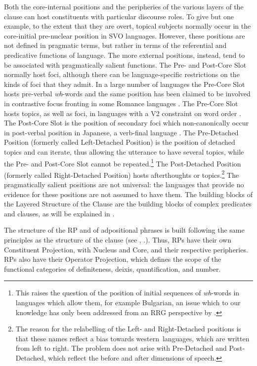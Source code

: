 \documentclass[output=paper,hidelinks]{langscibook}
\begin{document}
  Both the core-internal positions and the peripheries of the various layers of the clause can host constituents with particular discourse roles. To give but one example, to the extent that they are overt, topical subjects normally occur in the core-initial pre-nuclear position in SVO languages. However, these positions are not defined in pragmatic terms, but rather in terms of the referential and predicative functions of language. The more external positions, instead, tend to be associated with pragmatically salient functions. The Pre- and Post-Core Slot normally host foci, although there can be language-specific restrictions on the kinds of foci that they admit. In a large number of languages the Pre-Core Slot hosts pre-verbal \textit{wh}{}-words and the same position has been claimed to be involved in contrastive focus fronting in some Romance languages \citep{Bentley2008}. The Pre-Core Slot hosts topics, as well as foci, in languages with a V2 constraint on word order \citep{Diedrichsen2008}. The Post-Core Slot is the position of secondary foci which non-canonically occur in post-verbal position in Japanese, a verb-final language \citep{Shimojo1995}. The Pre-Detached Position (formerly called Left-Detached Position) is the position of detached topics and can iterate, thus allowing the utterance to have several topics, while the Pre- and Post-Core Slot cannot be repeated.\footnote{This raises the question of the position of initial sequences of \textit{wh}{}-words in languages which allow them, for example Bulgarian, an issue which to our knowledge has only been addressed from an RRG perspective by \citet{Eschenberg1999}.} The Post-Detached Position (formerly called Right-Detached Position) hosts afterthoughts or topics.\footnote{The reason for the relabelling of the Left{}- and Right{}-Detached positions is that these names reflect a bias towards western~languages, which are written from left to right. The problem does not arise with Pre-Detached and Post-Detached, which reflect the before and after dimensions of speech.} The pragmatically salient positions are not universal: the languages that provide no evidence for these positions are not assumed to have them. The building blocks of the Layered Structure of the Clause are the building blocks of complex predicates and clauses, as will be explained in .

  The structure of the RP and of adpositional phrases is built following the same principles as the structure of the clause (see \citealt{CortezRodriguez2022}, \citealt{Cerda2022}.). Thus, RPs have their own Constituent Projection, with Nucleus and Core, and their respective peripheries. RPs also have their Operator Projection, which defines the scope of the functional categories of definiteness, deixis, quantification, and number.
\end{document}
